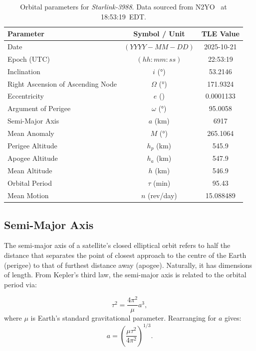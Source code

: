 \documentclass{article}
\begin{document}
\begin{table}[h]
    \centering
    \caption{Orbital parameters for \textit{Starlink-3988}. Data sourced from N2YO~\cite{n2yo_starlink3988} at 18:53:19~EDT.}
    \label{tab:starlink3988_orbit}
    \begin{tabular}{|l|c|c|}
        \hline
        \textbf{Parameter} & \textbf{Symbol / Unit} & \textbf{TLE Value} \\ \hline
        Date & $(YYYY-MM-DD)$ & 2025-10-21 \\ \hline
        Epoch (UTC) & $(hh:mm:ss)$ & 22:53:19 \\ \hline
        Inclination & $i$ (\si{\degree}) & 53.2146 \\ \hline
        Right Ascension of Ascending Node & $\Omega$ (\si{\degree}) & 171.9324 \\ \hline
        Eccentricity & $e$ () & 0.0001133 \\ \hline
        Argument of Perigee & $\omega$ (\si{\degree}) & 95.0058 \\ \hline
        Semi-Major Axis & $a$ (\si{\kilo\metre}) & 6917 \\ \hline
        Mean Anomaly & $M$ (\si{\degree}) & 265.1064 \\ \hline
        Perigee Altitude & $h_p$ (\si{\kilo\metre}) & 545.9 \\ \hline
        Apogee Altitude & $h_a$ (\si{\kilo\metre}) & 547.9 \\ \hline
        Mean Altitude & $h$ (\si{\kilo\metre}) & 546.9 \\ \hline
        Orbital Period & $\tau$ (\si{\minute}) & 95.43 \\ \hline
        Mean Motion & $n$ (\si{rev/day}) & 15.088489 \\ \hline
    \end{tabular}
\end{table}

\subsection{Semi-Major Axis}

The semi-major axis of a satellite's closed elliptical orbit refers to half the distance that separates the point of closest approach to the centre of the Earth (perigee) to that of furthest distance away (apogee). Naturally, it has dimensions of length. From Kepler's third law, the semi-major axis is related to the orbital period via:

\[
\tau^{2} = \frac{4\pi^{2}}{\mu} a^{3},
\]
where $\mu$ is Earth's standard gravitational parameter.  
Rearranging for $a$ gives:
\begin{equation}
\label{semi_major_axis_from_tau}
    a = \left( \frac{\mu \tau^{2}}{4\pi^{2}} \right)^{1/3}.
\end{equation}
\end{document}

